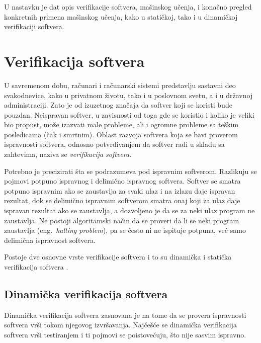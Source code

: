 \documentclass[a4paper]{article}
\theoremstyle{definition}
\begin{document}
{\par U nastavku je dat opis verifikacije soft\-ve\-ra, mašinskog učenja, i konačno pregled konkretnih primena mašinskog učenja, kako u statičkoj, tako i u dinamičkoj verifikaciji softvera.

\section{Verifikacija softvera}
\label{sec:verifikacija}

\par U savremenom dobu, računari i računarski sistemi predstavlju sastavni deo svakodnevice, kako u privatnom životu, tako i u poslovnom svetu, a i u državnoj administraciji. Zato je od izuzetnog značaja da softver koji se koristi bude pouzdan. Neispravan softver, u zavisnosti od toga gde se koristio i koliko je veliki bio propust, može izazvati male probleme, ali i ogromne probleme sa teškim posledicama (čak i smrtnim). Oblast razvoja softvera koja se bavi proverom ispravnosti softvera, odnosno potvrđivanjem da softver radi u skladu sa zahtevima, naziva se \emph{verifikacija softvera}.

\par Potrebno je precizirati šta se podrazumeva pod ispravnim softverom. Razlikuju se pojmovi potpuno ispravnog i delimično ispravnog softvera. Softver se smatra potpuno ispravnim ako se zaustavlja za svaki ulaz i na izlazu daje ispravan rezultat, dok se delimično ispravnim softverom smatra onaj koji za ulaz daje ispravan rezultat ako se zaustavlja, a dozvoljeno je da se za neki ulaz program ne zaustavlja. Ne postoji algoritamski način da se proveri da li se neki program zaustavlja (eng.~{\em halting problem}), pa se često ni ne ispituje potpuna, već samo delimična ispravnost softvera.

\par Postoje dve osnovne vrste verifikacije softvera i to su dinamička i statička verifikacija softvera \cite{milena}.

\subsection{Dinamička verifikacija softvera}
\label{subsec:dinamicka}

\par Dinamička verifikacija softvera zasnovana je na tome da se provera ispravnosti softvera vrši tokom njegovog izvršavanja. Najčešće se dinamička verifikacija softvera vrši testiranjem i ti pojmovi se poistovećuju, što nije sasvim ispravno.

}
\end{document}
